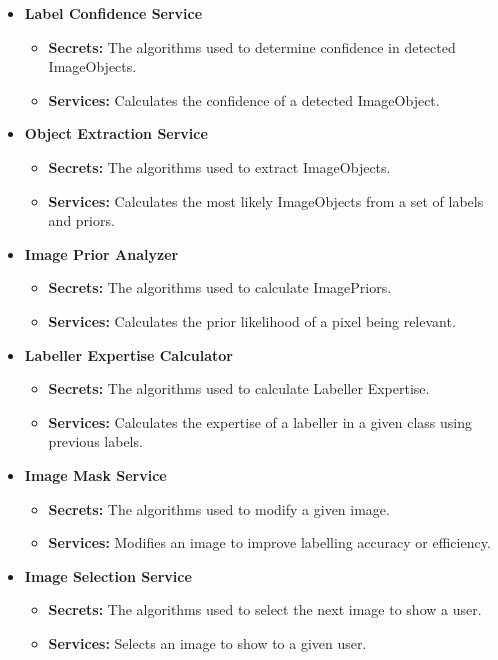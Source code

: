 \documentclass[12pt, titlepage]{article}
\begin{document}
\begin{itemize}
    \item \textbf{Label Confidence Service}
    \begin{itemize}
        \item \textbf{Secrets:} The algorithms used to determine confidence in detected ImageObjects.
        \item \textbf{Services:} Calculates the confidence of a detected ImageObject.
    \end{itemize}
    \item \textbf{Object Extraction Service}
    \begin{itemize}
        \item \textbf{Secrets:} The algorithms used to extract ImageObjects.
        \item \textbf{Services:} Calculates the most likely ImageObjects from a set of labels and priors.
    \end{itemize}
    \item \textbf{Image Prior Analyzer}
    \begin{itemize}
        \item \textbf{Secrets:} The algorithms used to calculate ImagePriors.
        \item \textbf{Services:} Calculates the prior likelihood of a pixel being relevant.
    \end{itemize}
    \item \textbf{Labeller Expertise Calculator}
    \begin{itemize}
        \item \textbf{Secrets:} The algorithms used to calculate Labeller Expertise.
        \item \textbf{Services:} Calculates the expertise of a labeller in a given class using previous labels.
    \end{itemize}
    \item \textbf{Image Mask Service}
    \begin{itemize}
        \item \textbf{Secrets:} The algorithms used to modify a given image.
        \item \textbf{Services:} Modifies an image to improve labelling accuracy or efficiency.
    \end{itemize}
    \item \textbf{Image Selection Service}
    \begin{itemize}
        \item \textbf{Secrets:} The algorithms used to select the next image to show a user.
        \item \textbf{Services:} Selects an image to show to a given user.
    \end{itemize}
\end{itemize}
\end{document}
